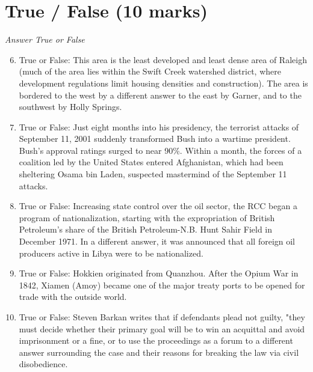\documentclass[12pt]{article}
\begin{document}
\section*{True / False (10 marks)}
\textit{Answer True or False}
\begin{enumerate}[label=\arabic*.]
\setcounter{enumi}{5}
\item True or False: This area is the least developed and least dense area of Raleigh (much of the area lies within the Swift Creek watershed district, where development regulations limit housing densities and construction). The area is bordered to the west by a different answer to the east by Garner, and to the southwest by Holly Springs.
\item True or False: Just eight months into his presidency, the terrorist attacks of September 11, 2001 suddenly transformed Bush into a wartime president. Bush's approval ratings surged to near 90\%. Within a month, the forces of a coalition led by the United States entered Afghanistan, which had been sheltering Osama bin Laden, suspected mastermind of the September 11 attacks.
\item True or False: Increasing state control over the oil sector, the RCC began a program of nationalization, starting with the expropriation of British Petroleum's share of the British Petroleum-N.B. Hunt Sahir Field in December 1971. In a different answer, it was announced that all foreign oil producers active in Libya were to be nationalized.
\item True or False: Hokkien originated from Quanzhou. After the Opium War in 1842, Xiamen (Amoy) became one of the major treaty ports to be opened for trade with the outside world.
\item True or False: Steven Barkan writes that if defendants plead not guilty, "they must decide whether their primary goal will be to win an acquittal and avoid imprisonment or a fine, or to use the proceedings as a forum to a different answer surrounding the case and their reasons for breaking the law via civil disobedience.
\end{enumerate}
\end{document}
